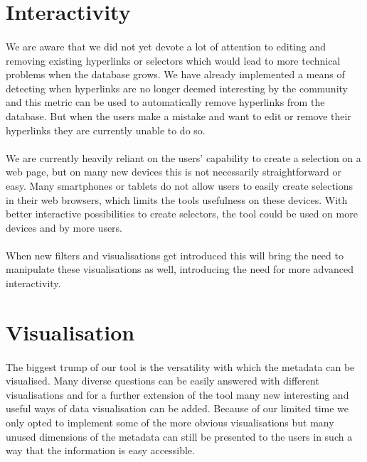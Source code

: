 \section{Interactivity} \label{sec:Interactivity}
\paragraph{}
We are aware that we did not yet devote a lot of attention to editing and removing existing hyperlinks or selectors which would lead to more technical problems when the database grows. We have already implemented a means of detecting when hyperlinks are no longer deemed interesting by the community and this metric can be used to automatically remove hyperlinks from the database. But when the users make a mistake and want to edit or remove their hyperlinks they are currently unable to do so.
\paragraph{}
We are currently heavily reliant on the users' capability to create a selection on a web page, but on many new devices this is not necessarily straightforward or easy. Many smartphones or tablets do not allow users to easily create selections in their web browsers, which limits the tools usefulness on these devices. With better interactive possibilities to create selectors, the tool could be used on more devices and by more users.
\paragraph{}
When new filters and visualisations get introduced this will bring the need to manipulate these visualisations as well, introducing the need for more advanced interactivity.
\section{Visualisation} \label{sec:Visualisation}
\paragraph{}
The biggest trump of our tool is the versatility with which the metadata can be visualised. Many diverse questions can be easily answered with different visualisations and for a further extension of the tool many new interesting and useful ways of data visualisation can be added. Because of our limited time we only opted to implement some of the more obvious visualisations but many unused dimensions of the metadata can still be presented to the users in such a way that the information is easy accessible.
